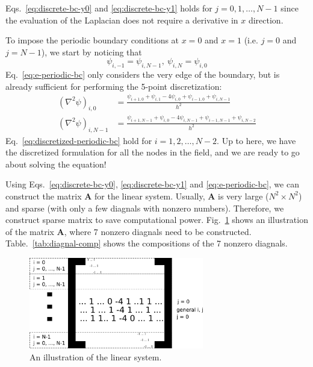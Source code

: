 \documentclass[onecolumn,aps, pre,amsmath,amssymb,longbibliography,11pt]{revtex4-2}
\begin{document}
%
Eqs.~\ref{eq:discrete-bc-y0} and \ref{eq:discrete-bc-y1} holds for $j = 0, 1, \dots, N-1$ since the evaluation of the Laplacian does not require a derivative in $x$ direction.

To impose the periodic boundary conditions at $x=0$ and $x=1$ (i.e. $j=0$ and $j=N-1$), we start by noticing that
%
\begin{equation}\label{eq:e-periodic-bc}
\psi_{i, -1} = \psi_{i, N-1}, \ \psi_{i, N} = \psi_{i, 0}
\end{equation}
%
Eq.~\ref{eq:e-periodic-bc} only considers the very edge of the boundary, but is already sufficient for performing the 5-point discretization:
\begin{equation}\label{eq:discretized-periodic-bc}
\begin{split}
(\nabla^2\psi)_{i, 0} & = \frac{\psi_{i+1, 0} + \psi_{i, 1} - 4\psi_{i, 0} + \psi_{i-1, 0} + \psi_{i, N-1}}{h^2} \\
(\nabla^2\psi)_{i, N-1} & = \frac{\psi_{i+1, N-1} + \psi_{i, 0} - 4\psi_{i, N-1} + \psi_{i-1, N-1} + \psi_{i, N-2}}{h^2}
\end{split}
\end{equation}
%
Eq.~\ref{eq:discretized-periodic-bc} hold for $i=1, 2, \dots, N-2$. Up to here, we have the discretized formulation for all the nodes in the field, and we are ready to go about solving the equation!

Using Eqs.~\ref{eq:discrete-bc-y0}, \ref{eq:discrete-bc-y1} and \ref{eq:e-periodic-bc}, we can construct the matrix $\bm{A}$ for the linear system. Usually, $\bm{A}$ is very large ($N^2\times N^2$) and sparse (with only a few diagnals with nonzero numbers). Therefore, we construct sparse matrix to save computational power.
Fig.~\ref{fig:A-matrix} shows an illustration of the matrix $\bm{A}$, where 7 nonzero diagnals need to be constructed. Table.~\ref{tab:diagnal-comp} shows the compositions of the 7 nonzero diagnals.
%
\begin{figure}[h]
\begin{center}
\includegraphics[width=3in]{Figures/A-matrix.png}
\caption[A-matrix]
{
An illustration of the linear system.
}
\label{fig:A-matrix}
\end{center}
\end{figure}
\end{document}
